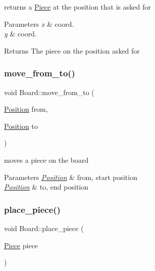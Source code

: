 returns a \hyperlink{class_piece}{Piece} at the position that is asked for 


\begin{DoxyParams}{Parameters}
{\em x} & coord. \\
\hline
{\em y} & coord. \\
\hline
\end{DoxyParams}
\begin{DoxyReturn}{Returns}
The piece on the position asked for 
\end{DoxyReturn}
\mbox{\label{class_board_a80a65ba64e71692a98908462b83c7225}} 
\subsubsection{\texorpdfstring{move\+\_\+from\+\_\+to()}{move\_from\_to()}}
{\footnotesize\ttfamily void Board\+::move\+\_\+from\+\_\+to (\begin{DoxyParamCaption}\item[{\hyperlink{struct_position}{Position}}]{from,  }\item[{\hyperlink{struct_position}{Position}}]{to }\end{DoxyParamCaption})}



moves a piece on the board 


\begin{DoxyParams}{Parameters}
{\em \hyperlink{struct_position}{Position}} & from, start position \\
\hline
{\em \hyperlink{struct_position}{Position}} & to, end position \\
\hline
\end{DoxyParams}
\mbox{\label{class_board_a84451a19dbe1741f08404a41b4394f76}} 
\subsubsection{\texorpdfstring{place\+\_\+piece()}{place\_piece()}}
{\footnotesize\ttfamily void Board\+::place\+\_\+piece (\begin{DoxyParamCaption}\item[{\hyperlink{class_piece}{Piece}}]{piece }\end{DoxyParamCaption})}



